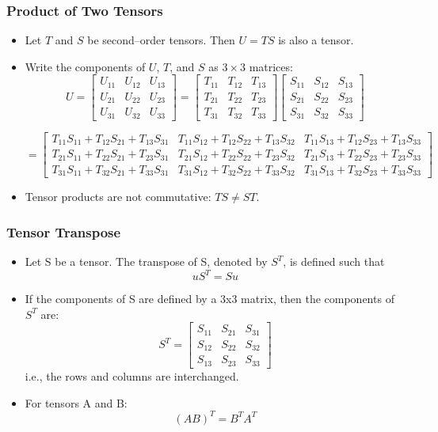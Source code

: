 \documentclass[aspectratio=169,11pt]{beamer}
\begin{document}
\begin{frame}
\frametitle{Product of Two Tensors}
\small
\begin{itemize}
    \item Let $T$ and $S$ be second–order tensors. Then $U = TS$ is also a tensor.
    \item Write the components of $U$, $T$, and $S$ as $3\times 3$ matrices:
\[
U =
\begin{bmatrix}
U_{11} & U_{12} & U_{13} \\
U_{21} & U_{22} & U_{23} \\
U_{31} & U_{32} & U_{33}
\end{bmatrix}
=
\begin{bmatrix}
T_{11} & T_{12} & T_{13} \\
T_{21} & T_{22} & T_{23} \\
T_{31} & T_{32} & T_{33}
\end{bmatrix}
\begin{bmatrix}
S_{11} & S_{12} & S_{13} \\
S_{21} & S_{22} & S_{23} \\
S_{31} & S_{32} & S_{33}
\end{bmatrix}
\]

\vspace{-2mm}
\scriptsize
\[
= \begin{bmatrix}
T_{11}S_{11} + T_{12}S_{21} + T_{13}S_{31} &
T_{11}S_{12} + T_{12}S_{22} + T_{13}S_{32} &
T_{11}S_{13} + T_{12}S_{23} + T_{13}S_{33} \\
T_{21}S_{11} + T_{22}S_{21} + T_{23}S_{31} &
T_{21}S_{12} + T_{22}S_{22} + T_{23}S_{32} &
T_{21}S_{13} + T_{22}S_{23} + T_{23}S_{33} \\
T_{31}S_{11} + T_{32}S_{21} + T_{33}S_{31} &
T_{31}S_{12} + T_{32}S_{22} + T_{33}S_{32} &
T_{31}S_{13} + T_{32}S_{23} + T_{33}S_{33}
\end{bmatrix}
\]
\small
    \item Tensor products are not commutative: $TS \neq ST$.
\end{itemize}
\end{frame}


\begin{frame}
\frametitle{Tensor Transpose}
\begin{itemize}
    \item Let S be a tensor. The transpose of S, denoted by \(S^T\), is defined such that
    \[
    u S^T = S u
    \]
    \item If the components of S are defined by a 3x3 matrix, then the components of \(S^T\) are: 
    \[
    S^T =
    \begin{bmatrix}
        S_{11} & S_{21} & S_{31} \\
        S_{12} & S_{22} & S_{32} \\
        S_{13} & S_{23} & S_{33}
    \end{bmatrix}
    \]
    i.e., the rows and columns are interchanged. 
    \item For tensors A and B: 
    \[
    (A B)^T = B^T A^T
    \]
\end{itemize}
\end{frame}
\end{document}

